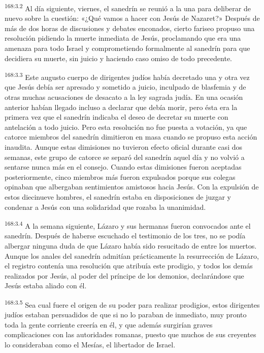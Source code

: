 \par 
\textsuperscript{168:3.2} Al día siguiente, viernes, el sanedrín se reunió a la una para deliberar de nuevo sobre la cuestión: «¿Qué vamos a hacer con Jesús de Nazaret?» Después de más de dos horas de discusiones y debates enconados, cierto fariseo propuso una resolución pidiendo la muerte inmediata de Jesús, proclamando que era una amenaza para todo Israel y comprometiendo formalmente al sanedrín para que decidiera su muerte, sin juicio y haciendo caso omiso de todo precedente.

\par 
\textsuperscript{168:3.3} Este augusto cuerpo de dirigentes judíos había decretado una y otra vez que Jesús debía ser apresado y sometido a juicio, inculpado de blasfemia y de otras muchas acusaciones de desacato a la ley sagrada judía. En una ocasión anterior habían llegado incluso a declarar que debía morir, pero ésta era la primera vez que el sanedrín indicaba el deseo de decretar su muerte con antelación a todo juicio. Pero esta resolución no fue puesta a votación, ya que catorce miembros del sanedrín dimitieron en masa cuando se propuso esta acción inaudita. Aunque estas dimisiones no tuvieron efecto oficial durante casi dos semanas, este grupo de catorce se separó del sanedrín aquel día y no volvió a sentarse nunca más en el consejo. Cuando estas dimisiones fueron aceptadas posteriormente, cinco miembros más fueron expulsados porque sus colegas opinaban que albergaban sentimientos amistosos hacia Jesús. Con la expulsión de estos diecinueve hombres, el sanedrín estaba en disposiciones de juzgar y condenar a Jesús con una solidaridad que rozaba la unanimidad.

\par 
\textsuperscript{168:3.4} A la semana siguiente, Lázaro y sus hermanas fueron convocados ante el sanedrín. Después de haberse escuchado el testimonio de los tres, no se podía albergar ninguna duda de que Lázaro había sido resucitado de entre los muertos. Aunque los anales del sanedrín admitían prácticamente la resurrección de Lázaro, el registro contenía una resolución que atribuía este prodigio, y todos los demás realizados por Jesús, al poder del príncipe de los demonios, declarándose que Jesús estaba aliado con él.

\par 
\textsuperscript{168:3.5} Sea cual fuere el origen de su poder para realizar prodigios, estos dirigentes judíos estaban persuadidos de que si no lo paraban de inmediato, muy pronto toda la gente corriente creería en él, y que además surgirían graves complicaciones con las autoridades romanas, puesto que muchos de sus creyentes lo consideraban como el Mesías, el libertador de Israel.


